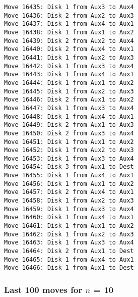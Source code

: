 \documentclass[11pt]{article}
\begin{document}
\begin{multicols}{2}
\begin{Verbatim}[fontsize=\small]
Move 16435: Disk 1 from Aux3 to Aux4
Move 16436: Disk 2 from Aux2 to Aux3
Move 16437: Disk 1 from Aux4 to Aux1
Move 16438: Disk 1 from Aux1 to Aux2
Move 16439: Disk 2 from Aux2 to Aux4
Move 16440: Disk 2 from Aux4 to Aux1
Move 16441: Disk 1 from Aux2 to Aux3
Move 16442: Disk 1 from Aux3 to Aux4
Move 16443: Disk 1 from Aux4 to Aux1
Move 16444: Disk 1 from Aux1 to Aux2
Move 16445: Disk 1 from Aux2 to Aux3
Move 16446: Disk 2 from Aux1 to Aux2
Move 16447: Disk 1 from Aux3 to Aux4
Move 16448: Disk 1 from Aux4 to Aux1
Move 16449: Disk 2 from Aux1 to Aux3
Move 16450: Disk 2 from Aux3 to Aux4
Move 16451: Disk 1 from Aux1 to Aux2
Move 16452: Disk 1 from Aux2 to Aux3
Move 16453: Disk 1 from Aux3 to Aux4
Move 16454: Disk 3 from Aux1 to Dest
Move 16455: Disk 1 from Aux4 to Aux1
Move 16456: Disk 1 from Aux1 to Aux2
Move 16457: Disk 2 from Aux4 to Aux1
Move 16458: Disk 1 from Aux2 to Aux3
Move 16459: Disk 1 from Aux3 to Aux4
Move 16460: Disk 1 from Aux4 to Aux1
Move 16461: Disk 1 from Aux1 to Aux2
Move 16462: Disk 1 from Aux2 to Aux3
Move 16463: Disk 1 from Aux3 to Aux4
Move 16464: Disk 2 from Aux1 to Dest
Move 16465: Disk 1 from Aux4 to Aux1
Move 16466: Disk 1 from Aux1 to Dest
\end{Verbatim}

\subsubsection*{Last 100 moves for $n$ = 10}


\end{multicols}
\end{document}
